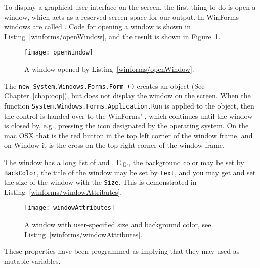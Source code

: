 To display a graphical user interface on the screen, the first thing to do is open a window, which acts as a reserved screen-space for our output. In WinForms windows are called . Code for opening a window is shown in Listing~\ref{winforms/openWindow}, and the result is shown in Figure~\ref{fig:openWindow}.
%
%
%
%
\begin{figure}
  \centering
  \texttt{[image: openWindow]}
  \caption{A window opened by Listing~\ref{winforms/openWindow}.}
  \label{fig:openWindow}
\end{figure}
The \lstinline!new System.Windows.Forms.Form ()! creates an object (See Chapter~\ref{chap:oop}), but does not display the window on the screen. When the function \lstinline!System.Windows.Forms.Application.Run! is applied to the object, then the control is handed over to the WinForms' , which continues until the window is closed by, e.g., pressing the icon designated by the operating system. On the mac OSX that is the red button in the top left corner of the window frame, and on Window it is the cross on the top right corner of the window frame.

The window has a long list of  and . E.g., the background color may be set by \lstinline!BackColor!, the title of the window may be set by \lstinline!Text!, and you may get and set the size of the window with the \lstinline!Size!. This is demonstrated in Listing~\ref{winforms/windowAttributes}.
%
%
\begin{figure}
  \centering
  \texttt{[image: windowAttributes]}
  \caption{A window with user-specified size and background color, see Listing~\ref{winforms/windowAttributes}.}
  \label{fig:windowAttributes}
\end{figure}
These properties have been programmed as  implying that they may used as mutable variables. 

